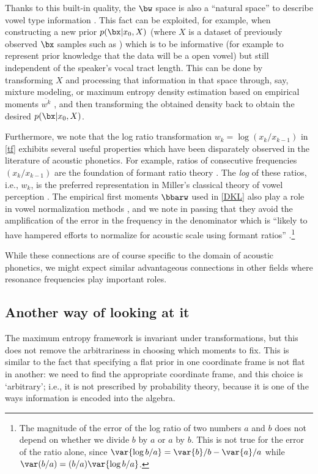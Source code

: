 \begin{chapterappendices}{6}
Thanks to this built-in quality, the $\bw$ space is also a ``natural space'' to describe vowel type information \citep{Turner2003}.
This fact can be exploited, for example, when constructing a new prior $p(\bx|x_0,X)$ (where $X$ is a dataset of previously observed $\bx$ samples such as \citep{Peterson1952}) which is to be informative (for example to represent prior knowledge that the data will be a open vowel) but still independent of the speaker's vocal tract length.
This can be done by transforming $X$ and processing that information in that space through, say, mixture modeling, or maximum entropy density estimation based on empirical moments $\overline{w^k}$ \citep{Bretthorst2013}, and then transforming the obtained density back to obtain the desired $p(\bx|x_0,X)$. 

Furthermore, we note that the log ratio transformation $w_k = \log(x_k/x_{k-1})$ in \eqref{tf} exhibits several useful properties which have been disparately observed in the literature of acoustic phonetics.
For example, ratios of consecutive frequencies $(x_k/x_{k-1})$ are the foundation of formant ratio theory \citep{Lloyd1890}.
The \emph{log} of these ratios, i.e., $w_k$, is the preferred representation in Miller's classical theory of vowel perception \citep{Miller1987}.
The empirical first moments $\bbarw$ used in \eqref{DKL} also play a role in vowel normalization methods \citep{Johnson2018}, and we note in passing that they avoid the amplification of the error in the frequency in the denominator which is ``likely to have hampered efforts to normalize for acoustic scale using formant ratios'' \citep[p.~2384]{Turner2009}.\footnote{%
The magnitude of the error of the log ratio of two numbers $a$ and $b$ does not depend on whether we divide $b$ by $a$ or $a$ by $b$.
This is not true for the error of the ratio alone, since $\var{\log{b/a}} = \var{b}/b - \var{a}/a$ while $\var(b/a) = (b/a) \var{\log{b/a}}$.
}

While these connections are of course specific to the domain of acoustic phonetics, we might expect similar advantageous connections in other fields where resonance frequencies play important roles.

\subsection{Another way of looking at it}

The maximum entropy framework is invariant under transformations, but this does not remove the arbitrariness in choosing which moments to fix.
This is similar to the fact that specifying a flat prior in one coordinate frame is not flat in another: we need to find the appropriate coordinate frame, and this choice is `arbitrary'; i.e., it is not prescribed by probability theory, because it is one of the ways information is encoded into the algebra.


\end{chapterappendices}
